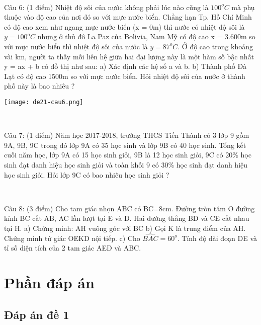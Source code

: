 \documentclass[12pt]{article}
\begin{document}
\

\newline Câu 6: (1 điểm) Nhiệt độ sôi của nước không phải lúc nào cũng là $100^oC$ mà phụ thuộc vào độ cao của nơi đó so với mực nước biển. Chẳng hạn Tp. Hồ Chí Minh có độ cao xem như ngang mực nước biển (x = 0m) thì nước có nhiệt độ sôi là $y = 100^oC$ nhưng ở thủ đô La Paz của Bolivia, Nam Mỹ có độ cao x = 3.600m so với mực nước biển thì nhiệt độ sôi của nước là $y = 87^oC$. Ở độ cao trong khoảng vài km, người ta thấy mối liên hệ giữa hai đại lượng này là một hàm số bậc nhất y = ax + b có đồ thị như sau:
\newline a) Xác định các hệ số a và b.
\newline b) Thành phố Đà Lạt có độ cao 1500m so với mực nước biển. Hỏi nhiệt độ sôi của nước ở thành phố này là bao nhiêu ?

\begin{center}
	\texttt{[image: de21-cau6.png]}
\end{center}

\

\newline Câu 7: (1 điểm) Năm học 2017-2018, trường THCS Tiến Thành có 3 lớp 9 gồm 9A, 9B, 9C trong đó lớp 9A có 35 học sinh và lớp 9B có 40 học sinh. Tổng kết cuối năm học, lớp 9A có 15 học sinh giỏi, 9B là 12 học sinh giỏi, 9C có 20\% học sinh đạt danh hiệu học sinh giỏi và toàn khối 9 có 30\% học sinh đạt danh hiệu học sinh giỏi. Hỏi lớp 9C có bao nhiêu học sinh giỏi ?

\

\newline Câu 8: (3 điểm) Cho tam giác nhọn ABC có BC=8cm. Đường tròn tâm O đường kính BC cắt AB, AC lần lượt tại E và D. Hai đường thẳng BD và CE cắt nhau tại H.
\newline a) Chứng minh: AH vuông góc với BC
\newline b) Gọi K là trung điểm của AH. Chứng minh tứ giác OEKD nội tiếp.
\newline c) Cho $\widehat{BAC} = 60^o$. Tính độ dài đoạn DE và tỉ số diện tích của 2 tam giác AED và ABC.

\break

\section{Phần đáp án}

\subsection{Đáp án đề 1}
\end{document}
